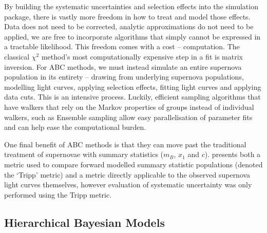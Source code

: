 \documentclass[a4paper,fleqn,usenatbib]{mnras}
\begin{document}
By building the systematic uncertainties and selection effects into the simulation package, there is vastly more freedom in how to treat and model those effects. Data does not need to be corrected, analytic approximations do not need to be applied, we are free to incorporate algorithms that simply cannot be expressed in a tractable likelihood. This freedom comes with a cost -- computation. The classical $\chi^2$ method's most computationally expensive step in a fit is matrix inversion. For ABC methods, we must instead simulate an entire supernova population in its entirety -- drawing from underlying supernova populations, modelling light curves, applying selection effects, fitting light curves and applying data cuts. This is an intensive process. Luckily, efficient sampling algorithms that have walkers that rely on the Markov properties of groups instead of individual walkers, such as Ensemble sampling \citep{Foreman-Mackey2013} allow easy parallelisation of parameter fits and can help ease the computational burden.

One final benefit of ABC methods is that they can move past the traditional treatment of supernovae with summary statistics ($m_B$, $x_1$ and $c$). \citet{Jennings2016} presents both a metric used to compare forward modelled summary statistic populations (denoted the `Tripp' metric) and a metric directly applicable to the observed supernova light curves themselves, however evaluation of systematic uncertainty was only performed using the Tripp metric.

\subsection{Hierarchical Bayesian Models}
\end{document}
